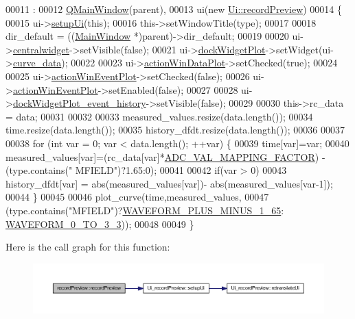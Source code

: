 \begin{DoxyCode}
00011                                                                                 :
00012     \hyperlink{a00010}{QMainWindow}(parent),
00013     ui(\textcolor{keyword}{new} \hyperlink{a00021}{Ui::recordPreview})
00014 \{
00015     ui->\hyperlink{a00028_afa41dc070a896a5eae476f3c0206825c}{setupUi}(\textcolor{keyword}{this});
00016     this->setWindowTitle(type);
00017 
00018     dir\_default = ((\hyperlink{a00006}{MainWindow} *)parent)->dir\_default;
00019 
00020     ui->\hyperlink{a00028_ac9ab4609922159e8e4cc45905f76928e}{centralwidget}->setVisible(\textcolor{keyword}{false});
00021     ui->\hyperlink{a00028_a07b76f17803ec09e0367b72938bbd097}{dockWidgetPlot}->setWidget(ui->\hyperlink{a00028_a247d94481323c0bc4f8b6458a8a535dd}{curve\_data});
00022 
00023     ui->\hyperlink{a00028_aa09067a9c96c9cd78f75261a9fcb89f0}{actionWinDataPlot}->setChecked(\textcolor{keyword}{true});
00024 
00025     ui->\hyperlink{a00028_ac72ec9c8679d46fd43a87f99ee6db893}{actionWinEventPlot}->setChecked(\textcolor{keyword}{false});
00026     ui->\hyperlink{a00028_ac72ec9c8679d46fd43a87f99ee6db893}{actionWinEventPlot}->setEnabled(\textcolor{keyword}{false});
00027 
00028     ui->\hyperlink{a00028_a2a8f7ee8d4458dd20481c8a1c29ce185}{dockWidgetPlot\_event\_history}->setVisible(\textcolor{keyword}{false});
00029 
00030     this->rc\_data = data;
00031 
00032 
00033     measured\_values.resize(data.length());
00034     time.resize(data.length());
00035     history\_dfdt.resize(data.length());
00036 
00037     
00038     \textcolor{keywordflow}{for} (\textcolor{keywordtype}{int} var = 0; var < data.length(); ++var) \{
00039         time[var]=var;
00040         measured\_values[var]=(rc\_data[var]*\hyperlink{a00031_ada92d3eeeec0cbeee41e76a52d145792}{ADC\_VAL\_MAPPING\_FACTOR}) - (type.contains(\textcolor{stringliteral}{"
      MFIELD"})?1.65:0);
00041 
00042         \textcolor{keywordflow}{if}(var > 0)
00043             history\_dfdt[var] = abs(measured\_values[var])- abs(measured\_values[var-1]);
00044     \}
00045 
00046     plot\_curve(time,measured\_values,
00047               (type.contains(\textcolor{stringliteral}{"MFIELD"})?\hyperlink{a00034_a0923d3b365a36e1e8c401cec964aa36f}{WAVEFORM\_PLUS\_MINUS\_1\_65}:
      \hyperlink{a00034_ae18fed2471b16a8516d721ff60671dd9}{WAVEFORM\_0\_TO\_3\_3}));
00048 
00049 \}
\end{DoxyCode}


Here is the call graph for this function\+:
\nopagebreak
\begin{figure}[H]
\begin{center}
\leavevmode
\includegraphics[width=350pt]{db/db2/a00020_a03ad4ae83a5594f6dc337c7b71873edd_cgraph}
\end{center}
\end{figure}


